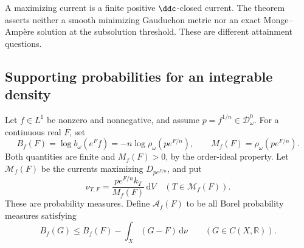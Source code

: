 A maximizing current is a finite positive $\ddc$-closed current. The theorem asserts neither a smooth minimizing Gauduchon metric nor an exact Monge--Amp\`ere solution at the subsolution threshold. These are different attainment questions.

\subsection{Supporting probabilities for an integrable density}

Let $f\in L^1$ be nonzero and nonnegative, and assume $p=f^{1/n}\in\mathcal D_\omega^0$. For a continuous real $F$, set
\[
 B_f(F)=\log b_\omega(e^Ff)
       =-n\log\rho_\omega(p e^{F/n}),\qquad
 M_f(F)=\rho_\omega(p e^{F/n}).
\]
Both quantities are finite and $M_f(F)>0$, by the order-ideal property. Let $\mathscr M_f(F)$ be the currents maximizing $D_{p e^{F/n}}$, and put
\[
 \nu_{T,F}=\frac{p e^{F/n} k_T}{M_f(F)}\,\mathrm{d}V
 \quad(T\in\mathscr M_f(F)).
\]
These are probability measures. Define $\mathcal A_f(F)$ to be all Borel probability measures satisfying
\begin{equation}\label{eq:integrable-threshold-support}
 B_f(G)\leq B_f(F)-\int_X(G-F)\,\mathrm{d}\nu
 \qquad(G\in C(X,\mathbb R)).
\end{equation}

